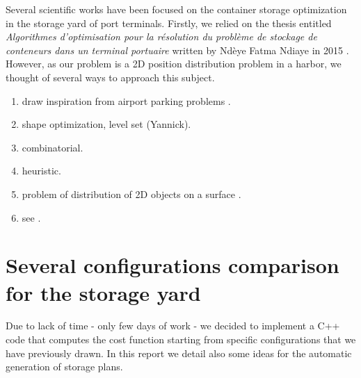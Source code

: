 \documentclass{article}
\begin{document}
Several scientific works have been focused on the container storage optimization in the storage yard of port terminals. 
Firstly, we relied on the thesis entitled \textit{Algorithmes d'optimisation pour la résolution du problème de stockage de conteneurs dans un terminal portuaire} written by Ndèye Fatma Ndiaye in 2015 \cite{ndiaye2015}.
However, as our problem is a 2D position distribution problem in a harbor, we thought of several ways to approach this subject.



\begin{enumerate}[leftmargin=*,label=\emph{Solution \arabic*:}]
	\item draw inspiration from airport parking problems \cite{gotteland2004,deau2010optimisation}.
	\item shape optimization, level set (Yannick).
	\item combinatorial.
	\item heuristic.
	\item problem of distribution of 2D objects on a surface \cite{jacquenot2010}.
	\item see \cite{kim98}.
\end{enumerate}



\section{Several configurations comparison for the storage yard}

Due to lack of time - only few days of work - we decided to implement a C++ code that computes the cost function starting from specific configurations that we have previously drawn.
In this report we detail also some ideas for the automatic generation of storage plans.
\end{document}

